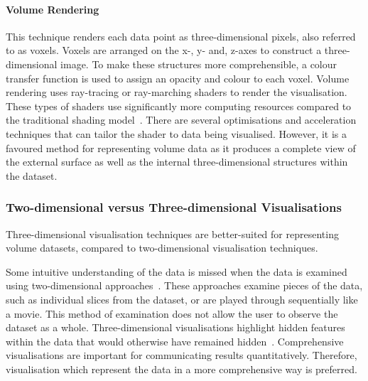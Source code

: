\paragraph{Volume Rendering}
This technique renders each data point as three-dimensional pixels, also referred to as voxels. 
Voxels are arranged on the x-, y- and, z-axes to construct a three-dimensional image.
To make these structures more comprehensible, a colour transfer function is used to assign an opacity and colour to each voxel.
Volume rendering uses ray-tracing or ray-marching shaders to render the visualisation.
These types of shaders use significantly more computing resources compared to the traditional shading model~\cite{Wittenbrink2000}.
There are several optimisations and acceleration techniques that can tailor the shader to data being visualised.
However, it is a favoured method for representing volume data as it produces a complete view of the external surface as well as the internal three-dimensional structures within the dataset.

\subsubsection{Two-dimensional versus Three-dimensional Visualisations}
Three-dimensional visualisation techniques are better-suited for representing volume datasets, compared to two-dimensional visualisation techniques.

Some intuitive understanding of the data is missed when the data is examined using two-dimensional approaches~\cite{Kent2013}.
These approaches examine pieces of the data, such as individual slices from the dataset, or are played through sequentially like a movie.
This method of examination does not allow the user to observe the dataset as a whole.
Three-dimensional visualisations highlight hidden features within the data that would otherwise have remained hidden~\cite{Ferrand2016}.
Comprehensive visualisations are important for communicating results quantitatively.
Therefore, visualisation which represent the data in a more comprehensive way is preferred.

